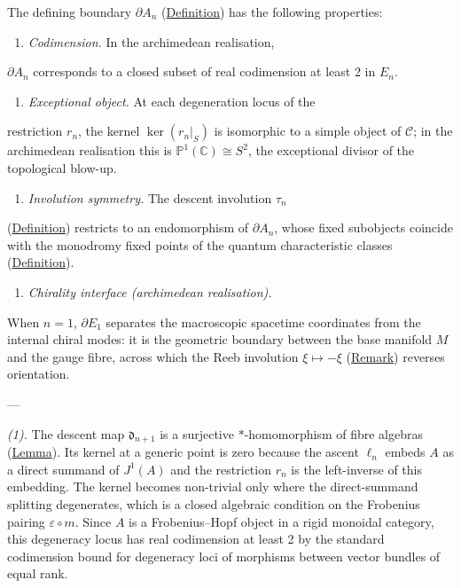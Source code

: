 \begin{proposition}
  \label{prop:brane-boundary}
The defining boundary $\partial A_n$
(\hyperref[def:brane-boundary]{Definition}) has the following properties:

\begin{enumerate}
  \item \emph{Codimension.}  In the archimedean realisation,
\end{enumerate}
   $\partial A_n$ corresponds to a closed subset of real codimension at
   least 2 in $E_n$.
\begin{enumerate}
  \item \emph{Exceptional object.}  At each degeneration locus of the
\end{enumerate}
   restriction $r_n$, the kernel $\ker(r_n|_S)$ is isomorphic to a
   simple object of $\mathcal{C}$; in the archimedean realisation
   this is $\mathbb{P}^1(\mathbb{C}) \cong S^2$, the exceptional divisor of the
   topological blow-up.
\begin{enumerate}
  \item \emph{Involution symmetry.}  The descent involution $\tau_n$
\end{enumerate}
   (\hyperref[def:descent-involution]{Definition}) restricts to an
   endomorphism of $\partial A_n$, whose fixed subobjects coincide
   with the monodromy fixed points of the quantum characteristic
   classes (\hyperref[def:quantum-characteristic-classes]{Definition}).
\begin{enumerate}
  \item \emph{Chirality interface (archimedean realisation).}
\end{enumerate}
   When $n = 1$, $\partial E_1$ separates the macroscopic spacetime
   coordinates from the internal chiral modes: it is the geometric
   boundary between the base manifold $M$ and the gauge fibre, across
   which the Reeb involution $\xi \mapsto -\xi$
   (\hyperref[rem:descartes-chirality]{Remark}) reverses orientation.

---

\emph{(1).} The descent map $\mathfrak{d}_{n+1}$ is a surjective
$*$-homomorphism of fibre algebras (\hyperref[lem:descent]{Lemma}).  Its kernel at a
generic point is zero because the ascent $\ell_n$ embeds $A$ as a direct
summand of $J^1(A)$ and the restriction $r_n$ is the left-inverse of this
embedding.  The kernel becomes non-trivial only where the direct-summand
splitting degenerates, which is a closed algebraic condition on the
Frobenius pairing $\varepsilon \circ m$.  Since $A$ is a Frobenius--Hopf
object in a rigid monoidal category, this degeneracy locus has real
codimension at least 2 by the standard codimension bound for degeneracy loci
of morphisms between vector bundles of equal rank.


\end{proposition}
